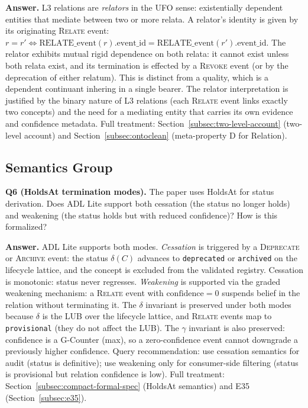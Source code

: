 \textbf{Answer.} L3 relations are \emph{relators} in the UFO sense: existentially dependent entities that mediate between two or more relata. A relator's identity is given by its originating \textsc{Relate} event: $r = r' \iff \text{RELATE\_event}(r).\text{event\_id} = \text{RELATE\_event}(r').\text{event\_id}$. The relator exhibits mutual rigid dependence on both relata: it cannot exist unless both relata exist, and its termination is effected by a \textsc{Revoke} event (or by the deprecation of either relatum). This is distinct from a quality, which is a dependent continuant inhering in a single bearer. The relator interpretation is justified by the binary nature of L3 relations (each \textsc{Relate} event links exactly two concepts) and the need for a mediating entity that carries its own evidence and confidence metadata. Full treatment: Section~\ref{subsec:two-level-account} (two-level account) and Section~\ref{subsec:ontoclean} (meta-property D for Relation).

\subsection{Semantics Group}\label{subsec:response-semantics}

\textbf{Q6 (HoldsAt termination modes).} The paper uses HoldsAt for status derivation. Does ADL Lite support both cessation (the status no longer holds) and weakening (the status holds but with reduced confidence)? How is this formalized?

\textbf{Answer.} ADL Lite supports both modes. \emph{Cessation} is triggered by a \textsc{Deprecate} or \textsc{Archive} event: the status $\delta(C)$ advances to \texttt{deprecated} or \texttt{archived} on the lifecycle lattice, and the concept is excluded from the validated registry. Cessation is monotonic: status never regresses. \emph{Weakening} is supported via the graded weakening mechanism: a \textsc{Relate} event with $\text{confidence} = 0$ suspends belief in the relation without terminating it. The $\delta$ invariant is preserved under both modes because $\delta$ is the LUB over the lifecycle lattice, and \textsc{Relate} events map to \texttt{provisional} (they do not affect the LUB). The $\gamma$ invariant is also preserved: confidence is a G-Counter (max), so a zero-confidence event cannot downgrade a previously higher confidence. Query recommendation: use cessation semantics for audit (status is definitive); use weakening only for consumer-side filtering (status is provisional but relation confidence is low). Full treatment: Section~\ref{subsec:compact-formal-spec} (HoldsAt semantics) and E35 (Section~\ref{subsec:e35}).

